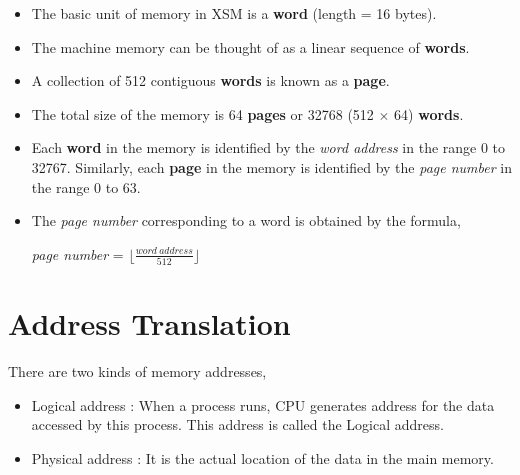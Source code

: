 \documentclass[11pt]{report}
\begin{document}

\begin{itemize}
\item The basic unit of memory in XSM is a \textbf{word} (length = 16 bytes).
\item The machine memory can be thought of as a linear sequence of \textbf{words}.
\item A collection of 512 contiguous \textbf{words} is known as a \textbf{page}.
\item The total size of the memory is 64 \textbf{pages} or 32768 (512 $\times$ 64) \textbf{words}.
\item Each \textbf{word} in the memory is identified by the \textit{word address} in the range 0 to 32767. Similarly, each \textbf{page} in the memory is identified by the \textit{page number} in the range 0 to 63.
\item The \textit{page number} corresponding to a word is obtained by the formula,
\begin{center}
 \textit{ page number }= $\lfloor \frac{word\ address}{512} \rfloor$
\end{center}
\end{itemize}



\section{Address Translation}

There are two kinds of memory addresses,

\begin{itemize}
\item Logical address : When a process runs, CPU generates address for the data accessed by this process. This address is called the Logical address.

\item Physical address : It is the actual location of the data in the main memory.
\end{itemize}
\end{document}
